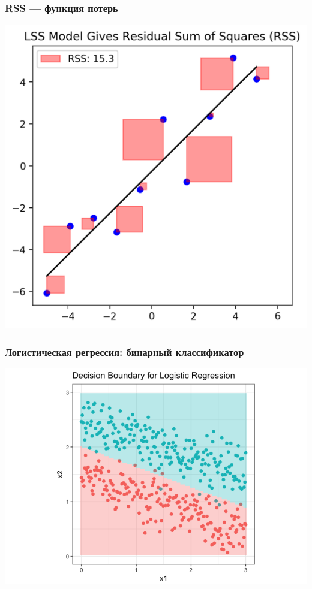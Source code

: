 \documentclass[svgnames]{beamer}
\begin{document}
\begin{frame}
  \frametitle{RSS — функция потерь}
  \centering
  \includegraphics[height=.8\textheight]{mse}
\end{frame}

\begin{frame}
  \frametitle{Логистическая регрессия: бинарный классификатор}
  \includegraphics[width=\textwidth]{decision-boundary}
\end{frame}
\end{document}
